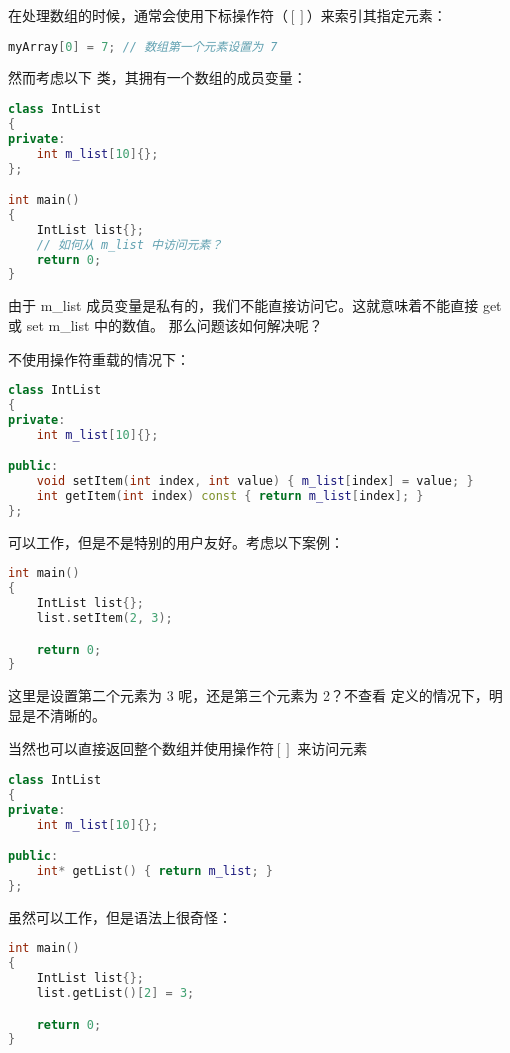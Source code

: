 \documentclass[../../LearnCpp.tex]{subfiles}
\begin{document}

在处理数组的时候，通常会使用下标操作符（$\left[\right]$）来索引其指定元素：

\begin{lstlisting}[language=C++]
myArray[0] = 7; // 数组第一个元素设置为 7
\end{lstlisting}

然而考虑以下  类，其拥有一个数组的成员变量：

\begin{lstlisting}[language=C++]
class IntList
{
private:
    int m_list[10]{};
};

int main()
{
    IntList list{};
    // 如何从 m_list 中访问元素？
    return 0;
}
\end{lstlisting}

由于 m\_list 成员变量是私有的，我们不能直接访问它。这就意味着不能直接 get 或 set m\_list 中的数值。
那么问题该如何解决呢？

不使用操作符重载的情况下：

\begin{lstlisting}[language=C++]
class IntList
{
private:
    int m_list[10]{};

public:
    void setItem(int index, int value) { m_list[index] = value; }
    int getItem(int index) const { return m_list[index]; }
};
\end{lstlisting}

可以工作，但是不是特别的用户友好。考虑以下案例：

\begin{lstlisting}[language=C++]
int main()
{
    IntList list{};
    list.setItem(2, 3);

    return 0;
}
\end{lstlisting}

这里是设置第二个元素为 3 呢，还是第三个元素为 2？不查看  定义的情况下，明显是不清晰的。

当然也可以直接返回整个数组并使用操作符$\left[\right]$ 来访问元素

\begin{lstlisting}[language=C++]
class IntList
{
private:
    int m_list[10]{};

public:
    int* getList() { return m_list; }
};
\end{lstlisting}

虽然可以工作，但是语法上很奇怪：

\begin{lstlisting}[language=C++]
int main()
{
    IntList list{};
    list.getList()[2] = 3;

    return 0;
}
\end{lstlisting}
\end{document}
